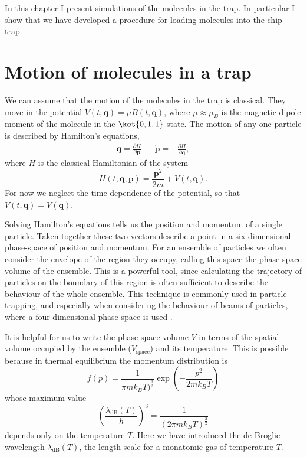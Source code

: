 In this chapter I present simulations of the molecules in the trap. In
particular I show that we have developed a procedure for loading molecules into
the chip trap.

\section{Motion of molecules in a trap}
\label{design:motion}

We can assume that the motion of the molecules in the trap is classical. They
move in the potential $V(t, \mathbf{q}) = \mu B(t, \mathbf{q})$, where
$\mu\approx\mu_B$ is the magnetic dipole moment of the molecule in the
$\ket{0,1,1}$ state.  The motion of any one particle is described by Hamilton's
equations,~\cite{Lichtenberg1969}
%
\begin{align}
  \label{design:eq:hamilton}
  \dot{\mathbf{q}} =  \frac{\partial H}{\partial \mathbf{p}} &&
  \dot{\mathbf{p}} = -\frac{\partial H}{\partial \mathbf{q}},
\end{align}
%
where $H$ is the classical Hamiltonian of the system
\begin{equation}
  H(t, \mathbf{q}, \mathbf{p}) = \frac{\mathbf{p}^2}{2m} + V(t, \mathbf{q}).
\end{equation}
For now we neglect the time dependence of the potential, so that $V(t,
\mathbf{q}) = V(\mathbf{q})$.

Solving Hamilton's equations tells us the position and momentum of a single
particle. Taken together these two vectors describe a point in a six
dimensional phase-space of position and momentum.
%
For an ensemble of particles we often consider the envelope of the region they
occupy, calling this space the phase-space volume of the ensemble. This is a
powerful tool, since calculating the trajectory of particles on the boundary of
this region is often sufficient to describe the behaviour of the whole
ensemble. This technique is commonly used in particle trapping, and especially
when considering the behaviour of beams of particles, where a four-dimensional
phase-space is used \cite{Hand1998, Lichtenberg1969}.

It is helpful for us to write the phase-space volume $V$ in terms of the
spatial volume occupied by the ensemble ($V_\text{space}$) and its temperature.
This is possible because in thermal equilibrium the momentum distribution is 
%
\begin{equation}
  f(p) = \frac{1}{\pi m k_B T)^\frac{3}{2}}\exp(-\frac{p^2}{2 m k_B T})
\end{equation}
%
whose maximum value
%
\begin{equation}
  \left(\frac{\lambda_\text{dB}(T)}{h}\right)^3 = \frac{1}{(2 \pi m k_B
  T)^\frac{3}{2}}
\end{equation}
%
depends only on the temperature $T$. Here we have introduced the de Broglie
wavelength $\lambda_\text{dB}(T)$, the length-scale for a monatomic gas of
temperature $T$.~\cite{blundell2}

